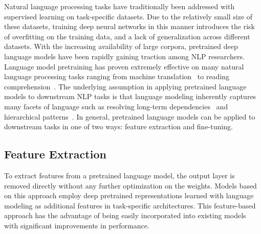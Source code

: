 Natural language processing tasks have traditionally been addressed with supervised learning on task-specific datasets.
Due to the relatively small size of these datasets, training deep neural networks in this manner introduces the risk of overfitting on the training data, and a lack of generalization across different datasets.
With the increasing availability of large corpora, pretrained deep language models have been rapidly gaining traction among NLP researchers.
Language model pretraining has proven extremely effective on many natural language processing tasks ranging from machine translation~\cite{vaswani2017attention, DBLP:journals/corr/abs-1901-07291} to reading comprehension~\cite{DBLP:journals/corr/abs-1907-11692}.
The underlying assumption in applying pretrained language models to downstream NLP tasks is that language modeling inherently captures many facets of language such as resolving long-term dependencies~\cite{DBLP:journals/corr/LinzenDG16} and hierarchical patterns~\cite{DBLP:journals/corr/abs-1803-11138}.
In general, pretrained language models can be applied to downstream tasks in one of two ways: feature extraction and fine-tuning.

\subsection{Feature Extraction}

To extract features from a pretrained language model, the output layer is removed directly without any further optimization on the weights.
Models based on this approach employ deep pretrained representations learned with language modeling as additional features in task-specific architectures.
This feature-based approach has the advantage of being easily incorporated into existing models with significant improvements in performance.

